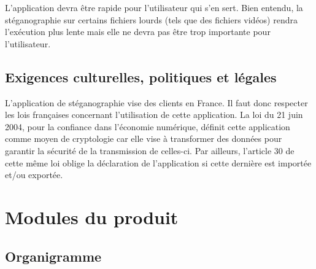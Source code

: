 \documentclass[11pt]{article}
\begin{document}
L'application devra être rapide pour l'utilisateur qui s'en sert. Bien entendu,
la stéganographie sur certains fichiers lourds (tels que des fichiers vidéos)
rendra l'exécution plus lente mais elle ne devra pas être trop importante pour
l'utilisateur. 

\subsection{Exigences culturelles, politiques et légales}

L'application de stéganographie vise des clients en France. Il faut donc
respecter les lois françaises concernant l'utilisation de cette application. La
loi du 21 juin 2004, pour la confiance dans l'économie numérique, définit cette
application comme moyen de cryptologie car elle vise à transformer des données
pour garantir la sécurité de la transmission de celles-ci. Par ailleurs,
l'article 30 de cette même loi oblige la déclaration de l'application si cette
dernière est importée et/ou exportée. 

\newpage

\section{Modules du produit}

\subsection{Organigramme}
\end{document}
